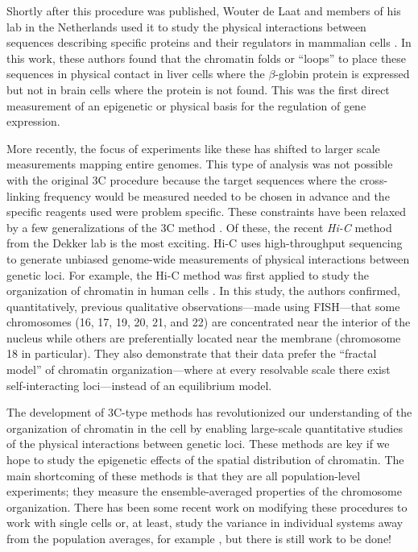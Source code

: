 \documentclass[12pt]{article}
\begin{document}
Shortly after this procedure was published, Wouter de Laat and members of his
lab in the Netherlands used it to study the physical interactions between
sequences describing specific proteins and their regulators in mammalian
cells \cite{looping}.
In this work, these authors found that the chromatin folds or ``loops'' to
place these sequences in physical contact in liver cells where the
$\beta$-globin protein is expressed but not in brain cells where the protein
is not found.
This was the first direct measurement of an epigenetic or physical basis for
the regulation of gene expression.

More recently, the focus of experiments like these has shifted to larger scale
measurements mapping entire genomes.
This type of analysis was not possible with the original 3C procedure because
the target sequences where the cross-linking frequency would be measured
needed to be chosen in advance and the specific reagents used were problem
specific.
These constraints have been relaxed by a few generalizations of the 3C method
\cite{4c, 5c, hi-c}.
Of these, the recent \emph{Hi-C} method \cite{hi-c} from the Dekker lab is the
most exciting.
Hi-C uses high-throughput sequencing to generate unbiased genome-wide
measurements of physical interactions between genetic loci.
For example, the Hi-C method was first applied to study the organization of
chromatin in human cells \cite{hi-c}.
In this study, the authors confirmed, quantitatively, previous qualitative
observations---made using FISH---that some chromosomes (16, 17, 19, 20, 21,
and 22) are concentrated near the interior of the nucleus while others are
preferentially located near the membrane (chromosome 18 in particular).
They also demonstrate that their data prefer the ``fractal model'' of
chromatin organization---where at every resolvable scale there exist
self-interacting loci---instead of an equilibrium model.

The development of 3C-type methods has revolutionized our understanding of the
organization of chromatin in the cell by enabling large-scale quantitative
studies of the physical interactions between genetic loci.
These methods are key if we hope to study the epigenetic effects of the
spatial distribution of chromatin.
The main shortcoming of these methods is that they are all population-level
experiments; they measure the ensemble-averaged properties of the chromosome
organization.
There has been some recent work on modifying these procedures to work with
single cells or, at least, study the variance in individual systems away from
the population averages, for example \cite{single, single2}, but there is
still work to be done!


\newpage

{}

\end{document}
